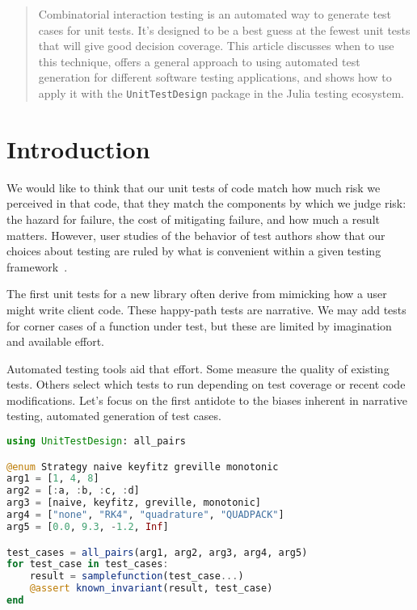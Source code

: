 \documentclass{juliacon}
\newcommand{\utd}{\texttt{UnitTestDesign}\xspace}
\begin{document}


\maketitle

\begin{abstract}
Combinatorial interaction testing is an automated way to generate test cases for unit tests. It's designed to be a best guess at the fewest unit tests that will give good decision coverage. This article discusses when to use this technique, offers a general approach to using automated test generation for different software testing applications, and shows how to apply it with the \utd package in the Julia testing ecosystem.
\end{abstract}

\section{Introduction}

We would like to think that our unit tests of code match how much risk we perceived in that code, that they match the components by which we judge risk: the hazard for failure, the cost of mitigating failure, and how much a result matters. However, user studies of the behavior of test authors show that our choices about testing are ruled by what is convenient within a given testing framework~\cite{Wiklund2017-ms}.

\vskip 6pt
The first unit tests for a new library often derive from mimicking how a user might write client code. These happy-path tests are narrative. We may add tests for corner cases of a function under test, but these are limited by imagination and available effort.

\vskip 6pt
Automated testing tools aid that effort. Some measure the quality of existing tests. Others select which tests to run depending on test coverage or recent code modifications. Let's focus on the first antidote to the biases inherent in narrative testing, automated generation of test cases.

\begin{lstlisting}[language=Julia]
using UnitTestDesign: all_pairs

@enum Strategy naive keyfitz greville monotonic
arg1 = [1, 4, 8]
arg2 = [:a, :b, :c, :d]
arg3 = [naive, keyfitz, greville, monotonic]
arg4 = ["none", "RK4", "quadrature", "QUADPACK"]
arg5 = [0.0, 9.3, -1.2, Inf]

test_cases = all_pairs(arg1, arg2, arg3, arg4, arg5)
for test_case in test_cases:
    result = samplefunction(test_case...)
    @assert known_invariant(result, test_case)
end
\end{lstlisting}
\end{document}
